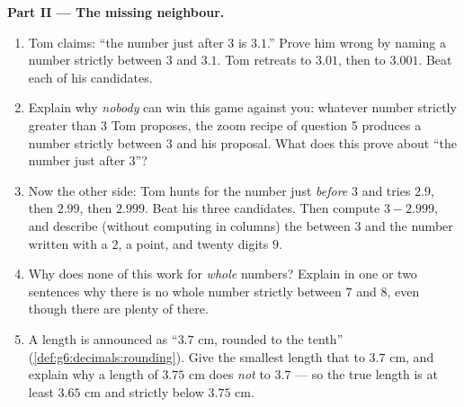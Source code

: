 \begin{problem}
\medskip
\noindent\textbf{Part II --- The missing neighbour.}
\begin{enumerate}[resume]
  \item Tom claims: ``the number just after $3$ is $3.1$.'' Prove
        him wrong by naming a number strictly between $3$ and
        $3.1$. Tom retreats to $3.01$, then to $3.001$. Beat each
        of his candidates.
  \item Explain why \emph{nobody} can win this game against you:
        whatever number strictly greater than $3$ Tom proposes,
        the zoom recipe of question 5 produces a number strictly
        between $3$ and his proposal. What does this prove about
        ``the number just after $3$''?
  \item Now the other side: Tom hunts for the number just
        \emph{before} $3$ and tries $2.9$, then $2.99$, then
        $2.999$. Beat his three candidates. Then compute
        $3 - 2.999$, and describe (without computing in columns)
        the  between $3$ and the number written with a
        $2$, a point, and twenty digits $9$.
  \item Why does none of this work for \emph{whole} numbers?
        Explain in one or two sentences why there is no whole
        number strictly between $7$ and $8$, even though there
        are plenty of  there.
  \item A length is announced as ``$3.7$ cm, rounded to the
        tenth'' (\cref{def:g6:decimals:rounding}). Give the
        smallest length that  to $3.7$ cm, and explain why
        a length of $3.75$ cm does \emph{not}  to $3.7$ ---
        so the true length is at least $3.65$ cm and strictly
        below $3.75$ cm.
\end{enumerate}


\end{problem}
